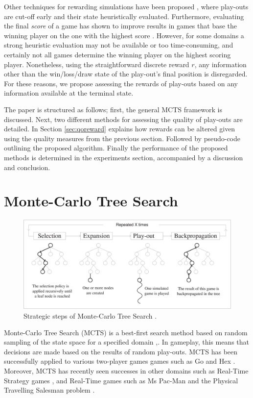 \documentclass{ecai2010}
\begin{document}
Other techniques for rewarding simulations have been proposed \cite{Winands2010a}, where play-outs are cut-off early and their state heuristically evaluated. Furthermore, evaluating the final \emph{score} of a game has shown to improve results in games that base the winning player on the one with the highest score \cite{shibahara2008combining}. However, for some domains a strong heuristic evaluation may not be available or too time-consuming, and certainly not all games determine the winning player on the highest scoring player. Nonetheless, using the straightforward discrete reward $r$, any information other than the win/loss/draw state of the play-out's final position is disregarded. For these reasons, we propose assessing the rewards of play-outs based on any information available at the terminal state.

The paper is structured as follows; first, the general MCTS framework is discussed. Next, two different methods for assessing the quality of play-outs are detailed. In Section \ref{sec:qoreward} explains how rewards can be altered given using the quality measures from the previous section. Followed by pseudo-code outlining the proposed algorithm. Finally the performance of the proposed methods is determined in the experiments section, accompanied by a discussion and conclusion.

\section{Monte-Carlo Tree Search}
\label{sec:mcts}
\begin{figure}[ht]
	\centering
	\includegraphics[width=.45\textwidth]{img/figure1.eps}
	\caption{Strategic steps of Monte-Carlo Tree Search \cite{chaslot2008progressive}.}
	\label{fig:mcts-algorithm}
\end{figure}
Monte-Carlo Tree Search (MCTS) is a best-first search method based on random sampling of the state space for a specified domain \cite{kocsis2006bandit},\cite{coulom2007efficient}. In gameplay, this means that decisions are made based on the results of random play-outs. MCTS has been successfully applied to various two-player games games such as Go \cite{lee2010current} and Hex \cite{arneson2010monte}. Moreover, MCTS has recently seen successes in other domains such as Real-Time Strategy games \cite{browne2012survey}, and Real-Time games such as Ms Pac-Man \cite{enhancementspacmancig12} and the Physical Travelling Salesman problem \cite{powleytsp}.
\end{document}
